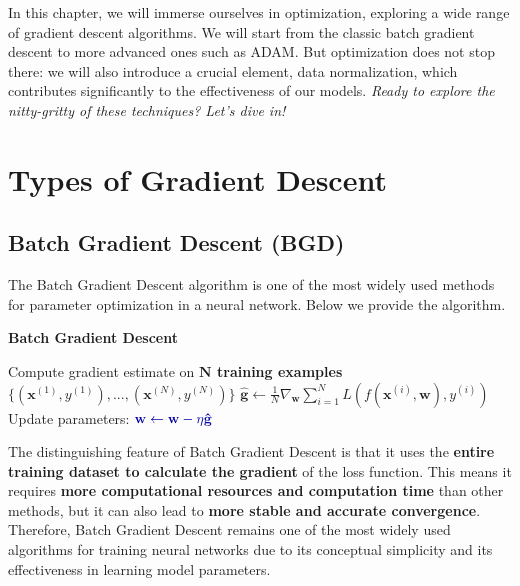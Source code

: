 \vspace{-0.4cm}
In this chapter, we will immerse ourselves in optimization, exploring a wide range of gradient descent algorithms. We will start from the classic batch gradient descent to more advanced ones such as ADAM. But optimization does not stop there: we will also introduce a crucial element, data normalization, which contributes significantly to the effectiveness of our models. \textit{Ready to explore the nitty-gritty of these techniques? Let's dive in!}
\vspace{-0.4cm}

\section{Types of Gradient Descent}

\subsection{Batch Gradient Descent (BGD)}

The Batch Gradient Descent algorithm is one of the most widely used methods for parameter optimization in a neural network. Below we provide the algorithm.

\begin{algorithm}
\renewcommand\thealgorithm{}
\caption{\textbf{\textcolor{mygreen}{Batch Gradient Descent}}}
\begin{algorithmic}[1]
    \STATE Compute gradient estimate on \textbf{\textcolor{myred}{$\mathbf{N}$ training examples}} $\{ (\mathbf{x}^{(1)}, y^{(1)}), ..., (\mathbf{x}^{(N)}, y^{(N)}) \}$
    \STATE $
    \mathbf{\hat{g}} \leftarrow \frac{1}{N}\nabla_{\mathbf{w}} \sum_{i=1}^{N} L(f(\mathbf{x}^{(i)},\mathbf{w}), y^{(i)})
    $
    \STATE Update parameters:
    $
    \textcolor{mybluee}{\mathbf{w} \leftarrow \mathbf{w} - \eta \mathbf{\hat{g}}} 
    $
\ENDWHILE
\end{algorithmic}
\end{algorithm}

The distinguishing feature of Batch Gradient Descent is that it uses the \textbf{\textcolor{myred}{entire training dataset to calculate the gradient}} of the loss function. This means it requires \textbf{more computational resources and computation time} than other methods, but it can also lead to \textbf{more stable and accurate convergence}.
Therefore, Batch Gradient Descent remains one of the most widely used algorithms for training neural networks due to its conceptual simplicity and its effectiveness in learning model parameters. 


